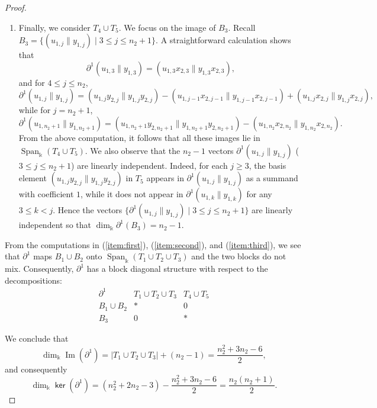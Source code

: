 \documentclass[a4paper, reqno, 11pt]{amsart}
\theoremstyle{definition}
\newcommand{\opname}[1]{\operatorname{\mathsf{#1}}}
\renewcommand{\ker}{\opname{ker}\nolimits}
\begin{document}
\begin{proof}
\begin{enumerate}[leftmargin=*, itemindent=0pt, labelindent=0pt, labelsep=0.5em]
		\item\label{item:third} Finally, we consider $T_4\cup T_5$. We focus on the image of $B_3$.
		Recall $B_3 = \{(u_{1,j} \parallel y_{1,j}) \mid 3 \le j \le n_2+1\}$. A straightforward calculation shows that
		\[
		\partial^1(u_{1,3} \parallel y_{1,3}) = (u_{1,3}x_{2,3} \parallel y_{1,3}x_{2,3}),
		\]
		and for $4 \le j \le n_2$,
		\[
		\partial^1(u_{1,j} \parallel y_{1,j}) = (u_{1,j}y_{2,j} \parallel y_{1,j}y_{2,j}) - (u_{1,j-1}x_{2,j-1} \parallel y_{1,j-1}x_{2,j-1}) + (u_{1,j}x_{2,j} \parallel y_{1,j}x_{2,j}),
		\]
		while for $j = n_2+1$,
		\[
		\partial^1(u_{1,n_2+1} \parallel y_{1,n_2+1}) = (u_{1,n_2+1}y_{2,n_2+1} \parallel y_{1,n_2+1}y_{2,n_2+1}) - (u_{1,n_2}x_{2,n_2} \parallel y_{1,n_2}x_{2,n_2}).
		\]
		From the above computation, it follows that all these images lie in $\operatorname{Span}_\Bbbk(T_4 \cup T_5)$. We also observe  that the $n_2-1$ vectors $\partial^1(u_{1,j} \parallel y_{1,j})$ ($3 \le j \le n_2+1$) are linearly independent.  
		Indeed, for each $j \ge 3$, the basis element $(u_{1,j}y_{2,j} \parallel y_{1,j}y_{2,j})$ in $T_5$ appears in $\partial^1(u_{1,j} \parallel y_{1,j})$ as a summand  with coefficient $1$, while it does not appear in $\partial^1(u_{1,k} \parallel y_{1,k})$ for any $3\leq k < j$.  Hence the vectors $\{\partial^1(u_{1,j} \parallel y_{1,j}) \mid  3 \le j \le n_2+1 \}$ are linearly independent so that
		\(
		\dim_\Bbbk \partial^1(B_3) = n_2 - 1.
		\)
	\end{enumerate}
	
	From the computations in (\ref{item:first}), (\ref{item:second}), and (\ref{item:third}), we see that $\partial^1$ maps $B_1 \cup B_2$ onto $\operatorname{Span}_\Bbbk(T_1 \cup T_2 \cup T_3)$ and the two blocks do not mix.  Consequently, $\partial^1$ has a block diagonal structure with respect to the decompositions:
	\[
	\begin{array}{c|cc}
		\partial^1 & T_1 \cup T_2 \cup T_3 & T_4 \cup T_5 \\
		\hline
		B_1 \cup B_2 & * & 0 \\
		B_3          & 0 & *
	\end{array}
	\]
	
	We conclude that
	\[
	\dim_\Bbbk \operatorname{Im}(\partial^1) = |T_1 \cup T_2 \cup T_3| + (n_2 - 1)= \frac{n_2^2 + 3n_2 - 6}{2},
	\]
	and consequently
	\[
	\dim_{\Bbbk} \ker(\partial^1) = (n_2^2+2n_2-3) - \frac{n_2^2 + 3n_2 - 6}{2} = \frac{n_2(n_2+1)}{2}.
	\]
	

\end{proof}
\end{document}
